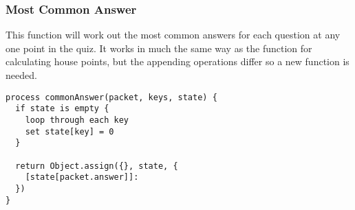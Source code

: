 \subsubsection{Most Common Answer}
This function will work out the most common answers for each question at any one point in the quiz. It works in much the same way as the function for calculating house points, but the appending operations differ so a new function is needed.
\begin{verbatim}
process commonAnswer(packet, keys, state) {
  if state is empty {
    loop through each key
    set state[key] = 0
  }
  
  return Object.assign({}, state, {
    [state[packet.answer]]: 
  })
}
\end{verbatim}

